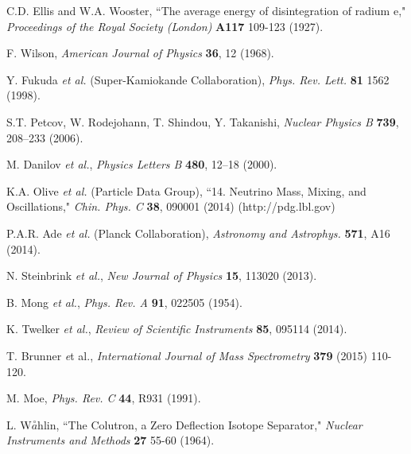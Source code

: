 \documentclass[PhD, copyrightpage]{csuthesis} %
\begin{document}
%


% 
% 
% 
% 
\newpage
 \begin{thebibliography}{00}
 
  C.D. Ellis and W.A. Wooster, ``The average energy of disintegration of radium e," \emph{Proceedings of the Royal Society (London)} \textbf{A117} 109-123 (1927).
 
  F. Wilson, \emph{American Journal of Physics} \textbf{36}, 12 (1968).
 
  Y. Fukuda \emph{et al.} (Super-Kamiokande Collaboration), \emph{Phys. Rev. Lett.} \textbf{81} 1562 (1998).
 
  S.T. Petcov, W. Rodejohann, T. Shindou, Y. Takanishi, \emph{Nuclear Physics B} \textbf{739}, 208–233 (2006).

  M. Danilov \emph{et al.}, \emph{Physics Letters B} \textbf{480}, 12–18 (2000).
 
  K.A. Olive \emph{et al.} (Particle Data Group), ``14. Neutrino Mass, Mixing, and Oscillations," \emph{Chin. Phys. C} \textbf{38}, 090001 (2014) (http://pdg.lbl.gov)
 
  P.A.R. Ade \emph{et al.} (Planck Collaboration), \emph{Astronomy and Astrophys.} \textbf{571}, A16 (2014).
 
  N. Steinbrink \emph{et al.}, \emph{New Journal of Physics} \textbf{15}, 113020 (2013).
 
  B. Mong \emph{et al.}, \emph{Phys. Rev. A} \textbf{91}, 022505 (1954).
 
  K. Twelker \emph{et al.}, \emph{Review of Scientific Instruments} \textbf{85}, 095114 (2014).
 
  T. Brunner \emph et al., \emph{International Journal of Mass Spectrometry} {\color{red}\textbf{379} (2015) 110-120.}
 
  M. Moe, \emph{Phys. Rev. C} \textbf{44}, R931 (1991).
 
  L. W$\overset{\circ}{a}$hlin, ``The Colutron, a Zero Deflection Isotope Separator," \emph{Nuclear Instruments and Methods} \textbf{27} 55-60 (1964).
 \end{thebibliography}
% 
\end{document}
